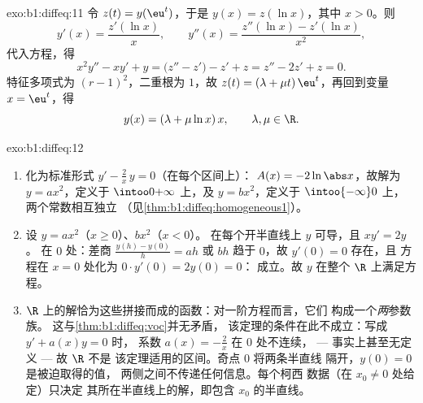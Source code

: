 \begin{solution}{exo:b1:diffeq:11}
令 $z(t) = y(\eu^t)$，于是 $y(x) = z(\ln x)$，其中 $x > 0$。则
\[
y'(x) = \frac{z'(\ln x)}x,
\qquad
y''(x) = \frac{z''(\ln x) - z'(\ln x)}{x^2} ,
\]
代入方程，得
\[
x^2y'' - xy' + y = \bigl(z'' - z'\bigr) - z' + z
= z'' - 2z' + z = 0 .
\]
特征多项式为 $(r - 1)^2$，二重根为 $1$，故 $z(t) =
(\lambda + \mu t)\,\eu^t$，再回到变量 $x = \eu^t$，得
\[
y(x) = (\lambda + \mu\ln x)\,x,
\qquad \lambda, \mu \in \R .
\]
\end{solution}

\begin{solution}{exo:b1:diffeq:12}
\begin{enumerate}
  \item 化为标准形式 $y' - \frac2x\,y = 0$（在每个区间上）：
        $A(x) = -2\ln\abs x$，故解为 $y = a x^2$，定义于
        $\intoo0{+\infty}$ 上，及 $y = b x^2$，定义于 $\intoo{-\infty}0$ 上，
        两个常数相互独立
        （见\cref{thm:b1:diffeq:homogeneous1}）。
  \item 设 $y = ax^2$（$x \geq 0$）、$bx^2$（$x < 0$）。
        在每个开半直线上 $y$ 可导，且 $xy' = 2y$。
        在 $0$ 处：差商 $\frac{y(h) - y(0)}h =
        ah$ 或 $bh$ 趋于 $0$，故 $y'(0) = 0$ 存在，且
        方程在 $x = 0$ 处化为 $0 \cdot y'(0) = 2y(0) = 0$：
        成立。故 $y$ 在整个 $\R$ 上满足方程。
  \item $\R$ 上的解恰为这些拼接而成的函数：对一阶方程而言，它们
        构成一个\emph{两}参数族。
        这与\cref{thm:b1:diffeq:voc}并无矛盾，
        该定理的条件在此不成立：写成 $y' + a(x)y = 0$ 时，
        系数 $a(x) = -\frac2x$ 在 $0$ 处不连续，
        --- 事实上甚至无定义 --- 故 $\R$ 不是
        该定理适用的区间。奇点 $0$ 将两条半直线
        隔开，$y(0) = 0$ 是被迫取得的值，
        两侧之间不传递任何信息。每个柯西
        数据（在 $x_0 \neq 0$ 处给定）只决定
        其所在半直线上的解，即包含 $x_0$ 的半直线。
\end{enumerate}
\end{solution}

